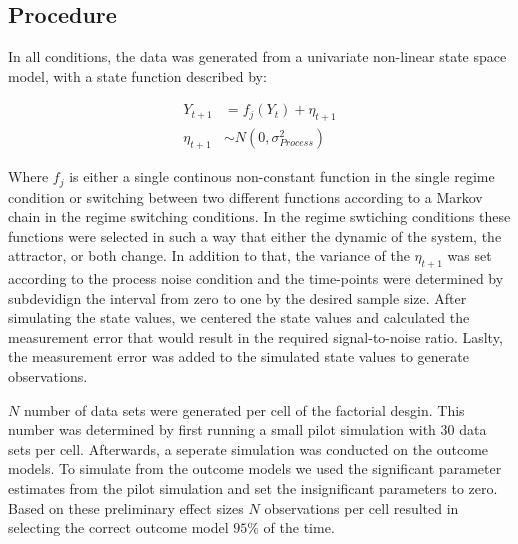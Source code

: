 \subsection{Procedure}

In all conditions, the data was generated from a univariate non-linear 
state space model, with a state function described by:

\begin{align*}
    Y_{t+1} &= f_j (Y_{t}) + \eta_{t+1} \\
    \eta_{t+1} &\sim N(0, \sigma^2_{Process})
\end{align*}

Where $f_j$ is either a single continous non-constant function in the single 
regime condition or switching between two different functions according to a 
Markov chain in the regime switching conditions. In the regime swtiching conditions 
these functions were selected in such a way that either the dynamic of the system, 
the attractor, or both change. In addition to that, the variance of the $\eta_{t+1}$
was set according to the process noise condition and the time-points 
were determined by subdevidign the interval from zero to one by the desired sample 
size. After simulating the state values, we centered the state values and calculated
the measurement error that would result in the required signal-to-noise ratio. 
Laslty, the measurement error was added to the simulated state values to generate 
observations. 

$N$ number of data sets were generated per cell of the factorial desgin. This number 
was determined by first running a small pilot simulation with 30 data sets per cell. 
Afterwards, a seperate simulation was conducted on the outcome models. To simulate 
from the outcome models we used the significant parameter estimates from the 
pilot simulation and set the insignificant parameters to zero. Based on these 
preliminary effect sizes $N$ observations per cell resulted in selecting the 
correct outcome model $95\%$ of the time.

